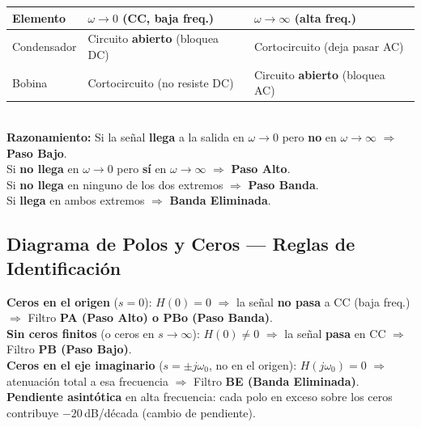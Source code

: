 \documentclass[12pt,a4paper]{article}
\begin{document}
\begin{formulabox}
\renewcommand{\arraystretch}{1.5}
\begin{tabular}{lll}
\toprule
\textbf{Elemento} & $\omega \to 0$ \;(CC, baja freq.) & $\omega \to \infty$ (alta freq.)\\
\midrule
Condensador & Circuito \textbf{abierto} (bloquea DC) & Cortocircuito (deja pasar AC)\\
Bobina      & Cortocircuito (no resiste DC) & Circuito \textbf{abierto} (bloquea AC)\\
\bottomrule
\end{tabular}\\[8pt]
\textbf{Razonamiento:} Si la señal \textbf{llega} a la salida en $\omega\to 0$ pero \textbf{no} en
$\omega\to\infty$ $\Rightarrow$ \textbf{Paso Bajo}.\\
Si \textbf{no llega} en $\omega\to 0$ pero \textbf{sí} en
$\omega\to\infty$ $\Rightarrow$ \textbf{Paso Alto}.\\
Si \textbf{no llega} en ninguno de los dos extremos $\Rightarrow$ \textbf{Paso Banda}.\\
Si \textbf{llega} en ambos extremos $\Rightarrow$ \textbf{Banda Eliminada}.
\end{formulabox}

\subsection{Diagrama de Polos y Ceros — Reglas de Identificación}

\begin{formulabox}
\textbf{Ceros en el origen} ($s = 0$): $H(0) = 0$ $\Rightarrow$ la señal \textbf{no
pasa} a CC (baja freq.) $\Rightarrow$ Filtro \textbf{PA (Paso Alto) o PBo (Paso Banda)}.\\[4pt]
\textbf{Sin ceros finitos} (o ceros en $s\to\infty$): $H(0) \neq 0$ $\Rightarrow$
la señal \textbf{pasa} en CC $\Rightarrow$ Filtro \textbf{PB (Paso Bajo)}.\\[4pt]
\textbf{Ceros en el eje imaginario} ($s = \pm j\omega_0$, no en el origen):
$H(j\omega_0) = 0$ $\Rightarrow$ atenuación total a esa frecuencia $\Rightarrow$
Filtro \textbf{BE (Banda Eliminada)}.\\[4pt]
\textbf{Pendiente asintótica} en alta frecuencia: cada polo en exceso sobre los ceros
contribuye $-20$\,dB/década (cambio de pendiente).
\end{formulabox}
\end{document}
